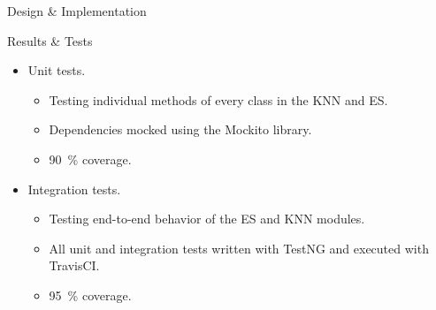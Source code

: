 \documentclass[final]{beamer} %
\begin{document}
\begin{frame}
\begin{columns}
\begin{column}{.34\textwidth}
{\begin{block}{Design \& Implementation}
				\end{block}
				\begin{block}{Results \& Tests}
					\begin{itemize}
						\item Unit tests.
						\begin{itemize}
							\item Testing individual methods of every class in the KNN and ES.
							\item Dependencies mocked using the Mockito library.
							\item \SI{90}{\percent} coverage.
						\end{itemize}
					\end{itemize}
					
					\begin{itemize}
						\item Integration tests.
						\begin{itemize}
							\item Testing end-to-end behavior of the ES and KNN modules.
							\item All unit and integration tests written with TestNG and executed with TravisCI.
							\item \SI{95}{\percent} coverage.
						\end{itemize}
					\end{itemize}
				

\end{block}}
\end{column}
\end{columns}
\end{frame}
\end{document}
